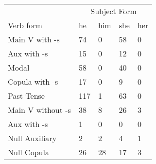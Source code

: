 \begin{table}[]
\begin{minipage}{0.5\textwidth}
\end{minipage}
\begin{minipage}{0.5\textwidth}
    \begin{tabular}{@{}lllll@{}}
        \toprule
            &\multicolumn{4}{c}{Subject Form}\\
            \cline{2-5}
        Verb form & he & him & she & her \\
        \midrule
        Main V with -s & 74 & 0 & 58 & 0 \\
        Aux with -s & 15 & 0 & 12 & 0 \\
        Modal & 58 & 0 & 40 & 0 \\
        Copula with -s & 17 & 0 & 9 & 0 \\
        Past Tense & 117 & 1 & 63 & 0 \\
        \hline
        Main V without -s & 38 & 8 & 26 & 3 \\
        Aux with -s & 1 & 0 & 0 & 0 \\
        Null Auxiliary & 2 & 2 & 4 & 1 \\
        Null Copula & 26 & 28 & 17 & 3 \\
        \bottomrule
    \end{tabular}
\end{minipage}
\end{table}
